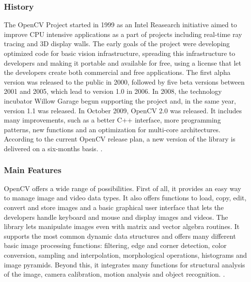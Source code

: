 	\subsubsection*{History}
	The OpenCV Project started in 1999 as an Intel Reasearch initiative aimed to improve CPU intensive applications as a part of projects including real-time ray tracing and 3D display walls. The early goals of the project were developing optimized code for basic vision infrastructure, spreading this infrastructure to developers and making it portable and available for free, using a license that let the developers create both commercial and free applications.\newline
	The first alpha version was released to the public in 2000, followed by five beta versions between 2001 and 2005, which lead to version 1.0 in 2006. In 2008, the technology incubator Willow Garage begun supporting the project and, in the same year, version 1.1  was released.
	In October 2009, OpenCV 2.0 was released. It includes many improvements, such as a better C++ interface, more programming patterns, new functions and an optimization for multi-core architectures. According to the current OpenCV release plan, a new version of the library is delivered on a six-months basis. \cite{OpenCV:ChangeLogs}.
	
	\subsubsection*{Main Features}
	OpenCV offers a wide range of possibilities. First of all, it provides an easy way to manage image and video data types. It also offers functions to load, copy, edit, convert and store images and a basic graphical user interface that lets the developers handle keyboard and mouse and display images and videos. The library lets manipulate images even with matrix and vector algebra routines. It supports the most common dynamic data structures and offers many different basic image processing functions: filtering, edge and corner detection, color conversion, sampling and interpolation, morphological operations, histograms and image pyramids. Beyond this, it integrates many functions for structural analysis of the image, camera calibration, motion analysis and object recognition. \cite{Agam2006}.
